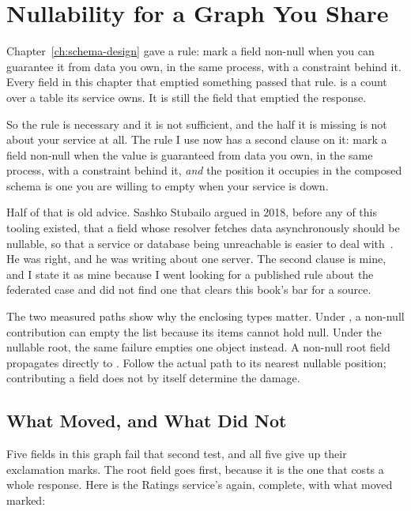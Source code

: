\section{Nullability for a Graph You Share}
\label{sec:ch14-nullability-for-a-graph-you-share}

%
Chapter~\ref{ch:schema-design} gave a rule: mark a field non-null when you can
guarantee it from data you own, in the same process, with a constraint behind
it. Every field in this chapter that emptied something passed that rule.
 is a count over a table its service owns. It is still the
field that emptied the response.

%
So the rule is necessary and it is not sufficient, and the half it is missing is
not about your service at all. The rule I use now has a second clause on it:
mark a field non-null when the value is guaranteed from data you own, in the
same process, with a constraint behind it, \emph{and} the position it occupies
in the composed schema is one you are willing to empty when your service is
down.

%
Half of that is old advice. Sashko Stubailo argued in 2018, before any of this
tooling existed, that a field whose resolver fetches data asynchronously should
be nullable, so that a service or database being unreachable is easier to deal
with~\autocite{stubailo2018}. He was right, and he was writing about one
server. The second clause is mine, and I state it as mine because I went
looking for a published rule about the federated case and did not find one that
clears this book's bar for a source.

%
The two measured paths show why the enclosing types matter.
Under , a non-null contribution can empty
the list because its items cannot hold null. Under the nullable
 root, the same failure empties one object instead.
A non-null root field propagates directly to . Follow the actual
path to its nearest nullable position; contributing a field does not by
itself determine the damage.

\subsection{What Moved, and What Did Not}

%
Five fields in this graph fail that second test, and all five give up their
exclamation marks. The root field goes first, because it is the one that costs
a whole response. Here is the Ratings service's  again,
complete, with what moved marked:

